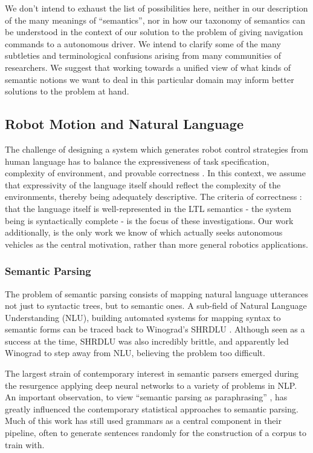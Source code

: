 \documentclass[a4paper, 11pt]{article}
\begin{document}
We don't intend to exhaust the list of possibilities here, neither in our
description of the many meanings of ``semantics'', nor in how our taxonomy of
semantics can be understood in the context of our solution to the problem of
giving navigation commands to a autonomous driver. We intend to clarify some of
the many subtleties and terminological confusions arising from many
communities of researchers. We suggest that working towards a unified view of
what kinds of semantic notions we want to deal in this particular domain may
inform better solutions to the problem at hand.

\subsection{Robot Motion and Natural Language}

The challenge of designing a system which generates robot control strategies
from human language has to balance the expressiveness of task specification,
complexity of environment, and provable correctness \cite{4141034}. In this
context, we assume that expressivity of the language itself should reflect the
complexity of the environments, thereby being adequately descriptive. The
criteria of correctness : that the language itself is well-represented in the
LTL semantics - the system being is syntactically complete - is the focus of
these investigations. Our work additionally, is the only work we know of which
actually seeks autonomous vehicles as the central motivation, rather than more
general robotics applications.

\subsubsection{Semantic Parsing}

The problem of semantic parsing consists of mapping natural language utterances
not just to syntactic trees, but to semantic ones. A sub-field of Natural
Language Understanding (NLU), building automated systems for mapping syntax to
semantic forms can be traced back to Winograd's SHRDLU
\cite{winograd1971procedures}. Although seen as a success at the time, SHRDLU
was also incredibly brittle, and apparently led Winograd to step away from NLU,
believing the problem too difficult.

The largest strain of contemporary interest in semantic parsers emerged during
the resurgence applying deep neural networks to a variety of problems in NLP.
An important observation, to view ``semantic parsing as paraphrasing''
\cite{berant-liang-2014-semantic}, has greatly influenced the contemporary
statistical approaches to semantic parsing. Much of this work has still used
grammars as a central component in their  pipeline, often to generate sentences
randomly for the construction of a corpus to train with.
\end{document}
